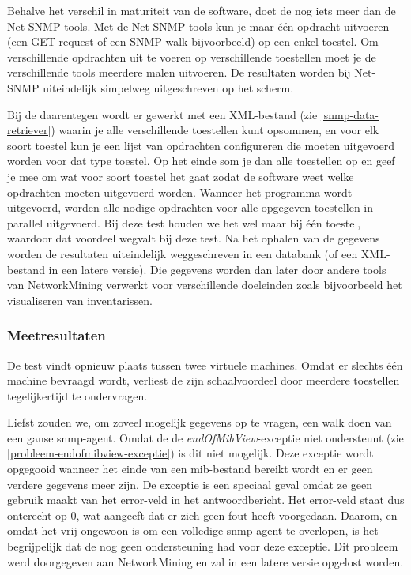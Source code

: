 Behalve het verschil in maturiteit van de software, doet de \nwmretriever{} nog iets meer dan de Net-SNMP tools.
Met de Net-SNMP tools kun je maar één opdracht uitvoeren (een GET-request of een SNMP walk bijvoorbeeld) op een enkel toestel.
Om verschillende opdrachten uit te voeren op verschillende toestellen moet je de verschillende tools meerdere malen uitvoeren.
De resultaten worden bij Net-SNMP uiteindelijk simpelweg uitgeschreven op het scherm.

Bij de \nwmretriever{} daarentegen wordt er gewerkt met een XML-bestand (zie \cref{snmp-data-retriever}) waarin je alle verschillende toestellen kunt opsommen,
en voor elk soort toestel kun je een lijst van opdrachten configureren die moeten uitgevoerd worden voor dat type toestel.
Op het einde som je dan alle toestellen op en geef je mee om wat voor soort toestel het gaat zodat de software weet welke opdrachten moeten uitgevoerd worden.
Wanneer het programma wordt uitgevoerd, worden alle nodige opdrachten voor alle opgegeven toestellen in parallel uitgevoerd.
Bij deze test houden we het wel maar bij één toestel, waardoor dat voordeel wegvalt bij deze test.
Na het ophalen van de gegevens worden de resultaten uiteindelijk weggeschreven in een databank (of een XML-bestand in een latere versie).
Die gegevens worden dan later door andere tools van NetworkMining verwerkt voor verschillende doeleinden zoals bijvoorbeeld het visualiseren van inventarissen.

\subsubsection{Meetresultaten}

De test vindt opnieuw plaats tussen twee virtuele machines.
Omdat er slechts één machine bevraagd wordt, verliest de \nwmretriever{} zijn schaalvoordeel door meerdere toestellen tegelijkertijd te ondervragen.

Liefst zouden we, om zoveel mogelijk gegevens op te vragen, een walk doen van een ganse \gls{snmp-agent}.
Omdat de \nwmretriever{} de \textit{endOfMibView}-exceptie niet ondersteunt (zie \cref{probleem-endofmibview-exceptie}) is dit niet mogelijk.
Deze exceptie wordt opgegooid wanneer het einde van een \gls{mib}-bestand bereikt wordt en er geen verdere gegevens meer zijn.
De exceptie is een speciaal geval omdat ze geen gebruik maakt van het error-veld in het antwoordbericht.
Het error-veld staat dus onterecht op 0, wat aangeeft dat er zich geen fout heeft voorgedaan.
Daarom, en omdat het vrij ongewoon is om een volledige \gls{snmp-agent} te overlopen,
is het begrijpelijk dat de \nwmretriever{} nog geen ondersteuning had voor deze exceptie.
Dit probleem werd doorgegeven aan NetworkMining en zal in een latere versie opgelost worden.


